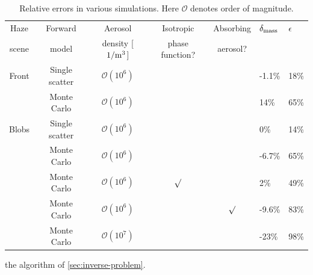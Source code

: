 \documentclass[10pt,letterpaper]{article}
\begin{document}
\begin{table}[t]
  \centering
  \begin{tabular}{cccccgg}
    \toprule
    Haze   & Forward        & Aerosol                 & Isotropic       & Absorbing & $\delta_{\rm mass}$ & $\epsilon~~$ \\
    scene  & model          & density [$1/{\rm m}^3$] & phase function? & aerosol?  &                     &              \\
     \midrule                                                                                             
    Front  & Single scatter & ${\mathcal{O}}(10^{6})$ &                 &           & -1.1\%               & 18\%         \\
           & Monte Carlo    & ${\mathcal{O}}(10^{6})$ &                 &           & 14\%               & 65\%         \\
    \cmidrule(r){1-5}                                                                                     
     Blobs & Single scatter & ${\mathcal{O}}(10^{6})$ &                 &           & 0\%                 & 14\%         \\
           & Monte Carlo    & ${\mathcal{O}}(10^{6})$ &                 &           & -6.7\%               & 65\%         \\
           & Monte Carlo    & ${\mathcal{O}}(10^{6})$ & $\surd$         &           & 2\%                & 49\%         \\
           & Monte Carlo    & ${\mathcal{O}}(10^{6})$ &                 & $\surd$   & -9.6\%               & 83\%         \\
           & Monte Carlo    & ${\mathcal{O}}(10^{7})$ &                 &           & -23\%                & 98\%         \\
    \bottomrule
  \end{tabular}
  \caption{Relative errors in various simulations. Here ${\mathcal{O}}$ denotes order of magnitude.}
  \label{tbl:mass}
\end{table}
the algorithm of \cref{sec:inverse-problem}. \\
\end{document}
